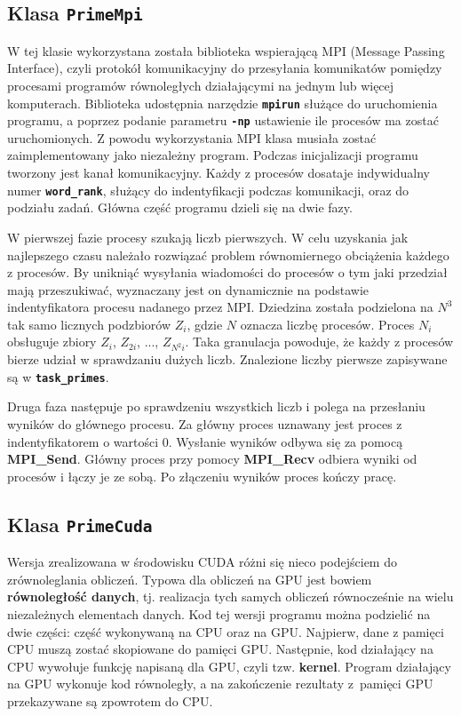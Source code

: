 \documentclass[12pt, twoside, hidelinks, a4paper]{article}
\begin{document}
\subsection{Klasa \textbf{\texttt{PrimeMpi}}}
W tej klasie wykorzystana została biblioteka wspierającą MPI (Message Passing Interface), czyli protokół komunikacyjny do przesyłania komunikatów pomiędzy procesami programów równoległych działającymi na jednym lub więcej komputerach.  Biblioteka udostępnia narzędzie \textbf{\texttt{mpirun}} służące do uruchomienia programu, a poprzez podanie parametru \textbf{\texttt{-np}} ustawienie ile procesów ma zostać uruchomionych. Z powodu wykorzystania MPI klasa musiała zostać zaimplementowany jako niezależny program. Podczas inicjalizacji programu tworzony jest kanał komunikacyjny. Każdy z procesów dosataje indywidualny numer \textbf{\texttt{word\_rank}}, służący do indentyfikacji podczas komunikacji, oraz do podziału zadań. Główna część programu dzieli się na dwie fazy.

W pierwszej fazie procesy szukają liczb pierwszych. W celu uzyskania jak najlepszego czasu należało rozwiązać problem równomiernego obciążenia każdego z procesów. By unikniąć wysyłania wiadomości do procesów o tym jaki przedział mają przeszukiwać, wyznaczany jest on dynamicznie na podstawie indentyfikatora procesu nadanego przez MPI. Dziedzina została podzielona na $N^3$ tak samo licznych podzbiorów $Z_i$, gdzie $N$ oznacza liczbę procesów. Proces $N_i$ obsługuje zbiory $Z_i$, $Z_{2i}$, ..., $Z_{N^2i}$. Taka granulacja powoduje, że każdy z procesów bierze udział w sprawdzaniu dużych liczb. Znalezione liczby pierwsze zapisywane są w \textbf{\texttt{task\_primes}}.

Druga faza następuje po sprawdzeniu wszystkich liczb i polega na przesłaniu wyników do głównego procesu. Za główny proces uznawany jest proces z indentyfikatorem o wartości $0$. Wysłanie wyników odbywa się za pomocą \textbf{MPI\_Send}. Główny proces przy pomocy \textbf{MPI\_Recv} odbiera wyniki od procesów i łączy je ze sobą. Po złączeniu wyników proces kończy pracę.      

\subsection{Klasa \textbf{\texttt{PrimeCuda}}}
Wersja zrealizowana w środowisku CUDA różni się nieco podejściem do zrównoleglania obliczeń. Typowa dla obliczeń na GPU jest bowiem \textbf{równoległość danych}, tj. realizacja tych samych obliczeń równocześnie na wielu niezależnych elementach danych.
Kod tej wersji programu można podzielić na dwie części: część wykonywaną na CPU oraz na GPU. Najpierw, dane z pamięci CPU muszą zostać skopiowane do pamięci GPU. Następnie, kod działający na CPU wywołuje funkcję napisaną dla GPU, czyli tzw. \textbf{kernel}. Program działający na GPU wykonuje kod równoległy, a na zakończenie rezultaty z~pamięci GPU przekazywane są zpowrotem do CPU.
\end{document}
